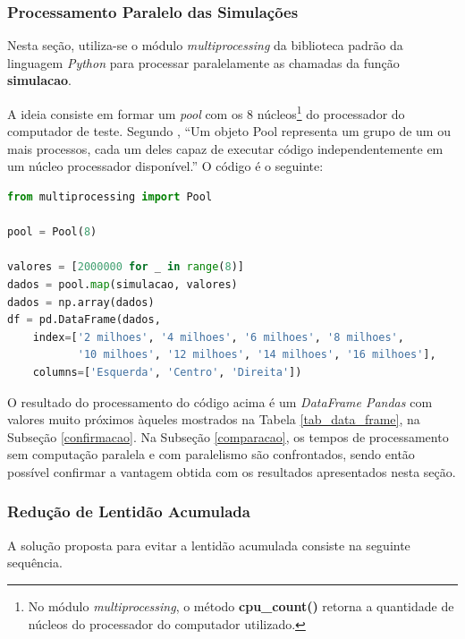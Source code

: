 \documentclass[12pt]{article}
\newcommand{\aspas}[1]{``#1''} %
\begin{document}
\subsubsection{Processamento Paralelo das Simulações}
\label{multiprocessing}

Nesta seção, utiliza-se o módulo \textit{multiprocessing} da biblioteca padrão da linguagem \textit{Python} para processar paralelamente as chamadas da função \textbf{simulacao}.

A ideia consiste em formar um \textit{pool} com os 8 núcleos\footnote{No módulo \textit{multiprocessing}, o método \textbf{cpu\_count()} retorna a quantidade de núcleos do processador do computador utilizado.} do processador do computador de teste. Segundo \cite{perkovic:2016}, \aspas{Um objeto Pool representa um grupo de um ou mais processos, cada um deles capaz de executar código independentemente em um núcleo processador disponível.} O código é o seguinte:

\begin{lstlisting}[language=Python]
from multiprocessing import Pool

pool = Pool(8)

valores = [2000000 for _ in range(8)]
dados = pool.map(simulacao, valores)
dados = np.array(dados)
df = pd.DataFrame(dados, 
	index=['2 milhoes', '4 milhoes', '6 milhoes', '8 milhoes', 
		   '10 milhoes', '12 milhoes', '14 milhoes', '16 milhoes'], 
	columns=['Esquerda', 'Centro', 'Direita'])
\end{lstlisting}

O resultado do processamento do código acima é um \textit{DataFrame Pandas} com valores muito próximos àqueles mostrados na Tabela \ref{tab_data_frame}, na Subseção \ref{confirmacao}. Na Subseção \ref{comparacao}, os tempos de processamento sem computação paralela e com paralelismo são confrontados, sendo então possível confirmar a vantagem obtida com os resultados apresentados nesta seção.

\subsubsection{Redução de Lentidão Acumulada}

A solução proposta para evitar a lentidão acumulada consiste na seguinte sequência.
\end{document}
